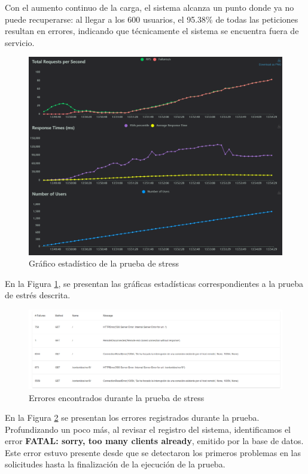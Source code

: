\documentclass[10pt,times,twocolumn]{article}
\begin{document}
Con el aumento continuo de la carga, el sistema alcanza un punto donde ya no puede recuperarse: al llegar a los 600 usuarios, el 95.38\% de todas las peticiones resultan en errores, indicando que técnicamente el sistema se encuentra fuera de servicio.

\begin{figure}[H]
	\centering
	\includegraphics[width=0.87\linewidth]{fig/prueba_grafico_estadistico.png}
	\caption{Gráfico estadístico de la prueba de stress}
	\label{fig:prueba_grafico_estadistico}
\end{figure}

En la Figura \ref{fig:prueba_grafico_estadistico}, se presentan las gráficas estadísticas correspondientes a la prueba de estrés descrita.

\begin{figure}[H]
	\centering
	\includegraphics[width=\linewidth]{fig/prueba_errores.png}
	\caption{Errores encontrados durante la prueba de stress}
	\label{fig:prueba_errores}
\end{figure}

En la Figura \ref{fig:prueba_errores} se presentan los errores registrados durante la prueba. Profundizando un poco más, al revisar el registro del sistema, identificamos el error \textbf{FATAL:  sorry, too many clients already}, emitido por la base de datos. Este error estuvo presente desde que se detectaron los primeros problemas en las solicitudes hasta la finalización de la ejecución de la prueba.
\end{document}
